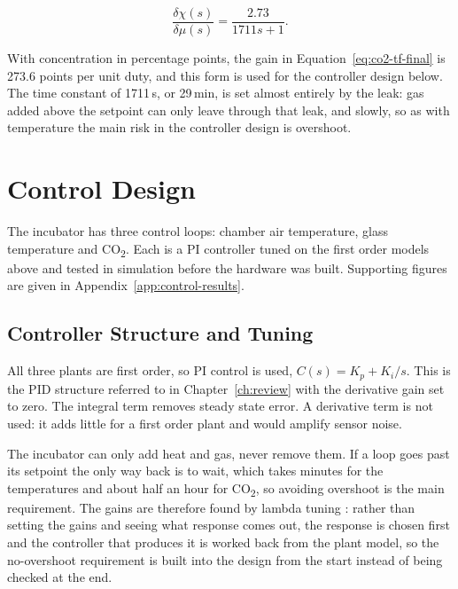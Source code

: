 \begin{equation}
\frac{\delta\chi(s)}{\delta\mu(s)} = \frac{2.73}{1711s+1}.
\label{eq:co2-tf-final}
\end{equation}

With concentration in percentage points, the gain in Equation~\ref{eq:co2-tf-final} is 273.6 points per unit duty, and this form is used for the controller design below. The time constant of 1711\,s, or 29\,min, is set almost entirely by the leak: gas added above the setpoint can only leave through that leak, and slowly, so as with temperature the main risk in the controller design is overshoot.

\section{Control Design}
\label{sec:control-design}

The incubator has three control loops: chamber air temperature, glass temperature and CO\textsubscript{2}. Each is a PI controller tuned on the first order models above and tested in simulation before the hardware was built. Supporting figures are given in Appendix~\ref{app:control-results}.

\subsection{Controller Structure and Tuning}
\label{subsec:tuning}

All three plants are first order, so PI control is used, $C(s) = K_p + K_i/s$. This is the PID structure referred to in Chapter~\ref{ch:review} with the derivative gain set to zero. The integral term removes steady state error. A derivative term is not used: it adds little for a first order plant and would amplify sensor noise.

The incubator can only add heat and gas, never remove them. If a loop goes past its setpoint the only way back is to wait, which takes minutes for the temperatures and about half an hour for CO\textsubscript{2}, so avoiding overshoot is the main requirement. The gains are therefore found by lambda tuning \citep{seborg_process_2016}: rather than setting the gains and seeing what response comes out, the response is chosen first and the controller that produces it is worked back from the plant model, so the no-overshoot requirement is built into the design from the start instead of being checked at the end.

